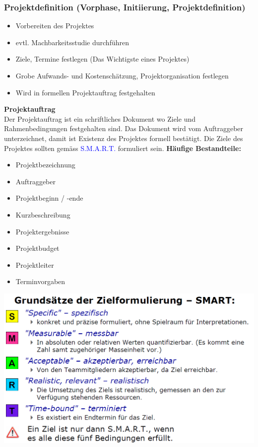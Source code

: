\subsubsection{Projektdefinition (Vorphase, Initiierung, Projektdefinition)}
\begin{itemize}
	\item Vorbereiten des Projektes
	\item evtl. Machbarkeitsstudie durchführen
	\item Ziele, Termine festlegen (Das Wichtigste eines Projektes)
	\item Grobe Aufwands- und Kostenschätzung, Projektorganisation festlegen
	\item Wird in formellen Projektauftrag festgehalten
\end{itemize}
	\begin{minipage}{9cm}
		\textbf{Projektauftrag} \\
		Der Projektauftrag ist ein schriftliches Dokument wo Ziele und Rahmenbedingungen festgehalten sind. Das Dokument wird vom Auftraggeber unterzeichnet, damit ist Existenz des Projektes formell bestätigt. \newline Die Ziele des Projektes sollten gemäss \textcolor{blue}{S.M.A.R.T.} formuliert sein.\newline
        {\small\textbf{ Häufige Bestandteile:}}
        \vspace{-0.3cm}
        \begin{multicols}{2}
            {\small
            \begin{itemize}
                \item Projektbezeichnung
                \item Auftraggeber
                \item Projektbeginn / -ende
                \item Kurzbeschreibung
                \item Projektergebnisse
                \item Projektbudget
                \item Projektleiter
                \item Terminvorgaben   
            \end{itemize}  }   
        \end{multicols}
	\end{minipage}
    \hfill
	\begin{minipage}{8.5cm}
		\includegraphics[width=\linewidth]{images/pmstart.png}
	\end{minipage}
